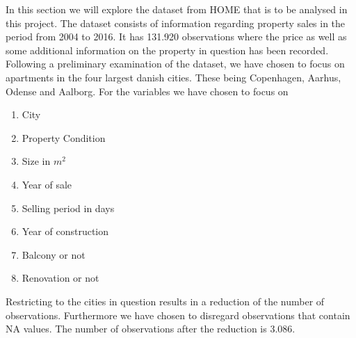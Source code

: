 In this section we will explore the dataset from HOME that is to be analysed in this project.
The dataset consists of information regarding property sales in the period from 2004 to 2016.
It has 131.920 observations where the price as well as some additional information on the property in question has been recorded.
Following a preliminary examination of the dataset, we have chosen to focus on apartments in the four largest danish cities. 
These being Copenhagen, Aarhus, Odense and Aalborg.
For the variables we have chosen to focus on
\begin{enumerate}
    \item City
    \item Property Condition
    \item Size in $m^2$
    \item Year of sale
    \item Selling period in days
    \item Year of construction
    \item Balcony or not
    \item Renovation or not
\end{enumerate}
Restricting to the cities in question results in a reduction of the number of observations.
Furthermore we have chosen to disregard observations that contain NA values.
The number of observations after the reduction is 3.086.


